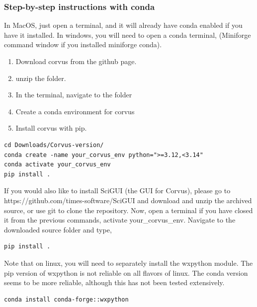 \subsubsection{Step-by-step instructions with conda}
In MacOS, just open a terminal, and it will already have conda enabled if you have it installed. In windows, you will need to open a conda terminal, (Miniforge command window if you installed miniforge conda).
\begin{enumerate}
\item Download corvus from the github page.
\item unzip the folder.
\item In the terminal, navigate to the folder
\item Create a conda environment for corvus
\item Install corvus with pip.
\end{enumerate}
\begin{verbatim}
cd Downloads/Corvus-version/
conda create -name your_corvus_env python=">=3.12,<3.14"
conda activate your_corvus_env
pip install .
\end{verbatim}

If you would also like to install SciGUI (the GUI for Corvus), please go to https://github.com/times-software/SciGUI
and download and unzip the archived source, or use git to clone the repository. Now, open a terminal if you have closed it from the previous commands,
activate your\_corvus\_env. Navigate to the downloaded source folder and type,
\begin{verbatim}
pip install .
\end{verbatim}

Note that on linux, you will need to separately install the wxpython module.  
The pip version of wxpython is not reliable on all flavors of linux. The conda version seems to be more reliable, although this has 
not been tested extensively. 
\begin{verbatim}
conda install conda-forge::wxpython
\end{verbatim}
